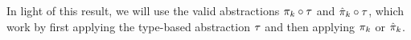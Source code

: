 \noindent 
In light of this result, we will use the valid abstractions $\pi_k\circ\tau$ and $\hat{\pi}_k\circ\tau$,
which work by first applying the type-based abstraction $\tau$ and then applying $\pi_k$ or $\hat{\pi}_k$.

%
%
%
%
%
%
%
%
%
%
